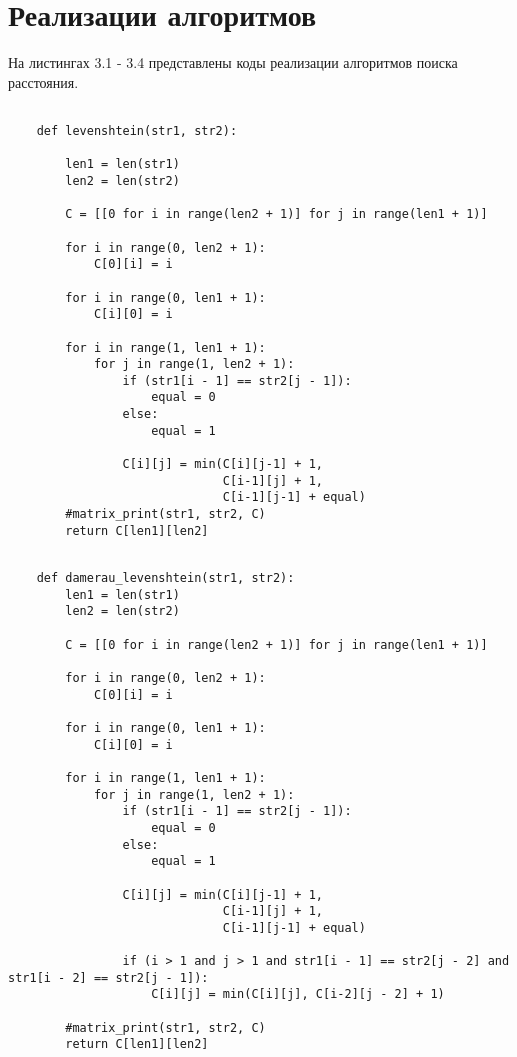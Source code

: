 \documentclass[12pt, a4paper]{report}
\begin{document}
	\section{Реализации алгоритмов}
	На листингах 3.1 - 3.4 представлены коды реализации алгоритмов поиска расстояния.
	\begin{lstlisting}[label=some-code,caption=Матричная реализация алгоритма Левенштейна]
		
	def levenshtein(str1, str2):
	
		len1 = len(str1)
		len2 = len(str2)
	
		C = [[0 for i in range(len2 + 1)] for j in range(len1 + 1)]
	
		for i in range(0, len2 + 1):
			C[0][i] = i
	
		for i in range(0, len1 + 1):
			C[i][0] = i
	
		for i in range(1, len1 + 1):
			for j in range(1, len2 + 1):
				if (str1[i - 1] == str2[j - 1]):
					equal = 0
				else:
					equal = 1
	
				C[i][j] = min(C[i][j-1] + 1,
							  C[i-1][j] + 1,
							  C[i-1][j-1] + equal)
		#matrix_print(str1, str2, C)
		return C[len1][len2]
	\end{lstlisting}

	\begin{lstlisting}[label=some-code,caption=Матричная реализация алгоритма Дамерау-Левенштейна]
	
	def damerau_levenshtein(str1, str2):
		len1 = len(str1)
		len2 = len(str2)
		
		C = [[0 for i in range(len2 + 1)] for j in range(len1 + 1)]
		
		for i in range(0, len2 + 1):
			C[0][i] = i
		
		for i in range(0, len1 + 1):
			C[i][0] = i
		
		for i in range(1, len1 + 1):
			for j in range(1, len2 + 1):
				if (str1[i - 1] == str2[j - 1]):
					equal = 0
				else:
					equal = 1
		
				C[i][j] = min(C[i][j-1] + 1,
							  C[i-1][j] + 1,
							  C[i-1][j-1] + equal)
		
				if (i > 1 and j > 1 and str1[i - 1] == str2[j - 2] and str1[i - 2] == str2[j - 1]):
					C[i][j] = min(C[i][j], C[i-2][j - 2] + 1)
		
		#matrix_print(str1, str2, C)
		return C[len1][len2]
	
	\end{lstlisting}
\end{document}
